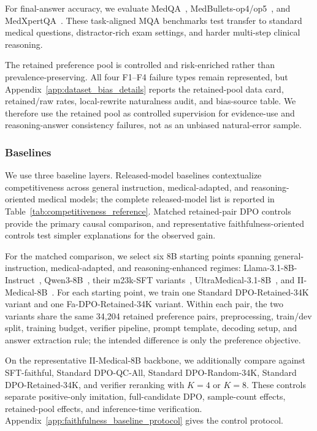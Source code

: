 \documentclass[a4paper,fleqn,doubleblind]{cas-sc}
\begin{document}
For final-answer accuracy, we evaluate MedQA~\cite{jin2021disease}, MedBullets-op4/op5~\cite{chen2025benchmarking}, and MedXpertQA~\cite{zuo2025medxpertqa}. These task-aligned MQA benchmarks test transfer to standard medical questions, distractor-rich exam settings, and harder multi-step clinical reasoning.

The retained preference pool is controlled and risk-enriched rather than prevalence-preserving. All four F1--F4 failure types remain represented, but Appendix~\ref{app:dataset_bias_details} reports the retained-pool data card, retained/raw rates, local-rewrite naturalness audit, and bias-source table. We therefore use the retained pool as controlled supervision for evidence-use and reasoning-answer consistency failures, not as an unbiased natural-error sample.

\subsubsection{Baselines}

We use three baseline layers. Released-model baselines contextualize competitiveness across general instruction, medical-adapted, and reasoning-oriented medical models; the complete released-model list is reported in Table~\ref{tab:competitiveness_reference}. Matched retained-pair DPO controls provide the primary causal comparison, and representative faithfulness-oriented controls test simpler explanations for the observed gain.

For the matched comparison, we select six 8B starting points spanning general-instruction, medical-adapted, and reasoning-enhanced regimes: Llama-3.1-8B-Instruct~\cite{dubey2024llama}, Qwen3-8B~\cite{yang2025qwen3}, their m23k-SFT variants~\cite{huang2025m1}, UltraMedical-3.1-8B~\cite{zhang2024ultramedical}, and II-Medical-8B~\cite{intelligentinternet2025iimedical8b}. For each starting point, we train one Standard DPO-Retained-34K variant and one Fa-DPO-Retained-34K variant. Within each pair, the two variants share the same 34,204 retained preference pairs, preprocessing, train/dev split, training budget, verifier pipeline, prompt template, decoding setup, and answer extraction rule; the intended difference is only the preference objective.

On the representative II-Medical-8B backbone, we additionally compare against SFT-faithful, Standard DPO-QC-All, Standard DPO-Random-34K, Standard DPO-Retained-34K, and verifier reranking with $K=4$ or $K=8$. These controls separate positive-only imitation, full-candidate DPO, sample-count effects, retained-pool effects, and inference-time verification. Appendix~\ref{app:faithfulness_baseline_protocol} gives the control protocol.
\end{document}
